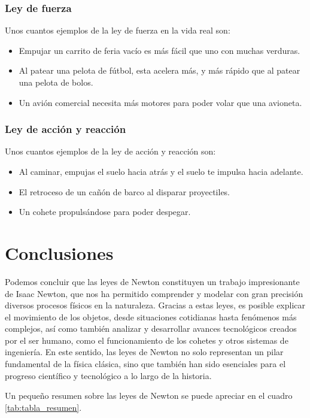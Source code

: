 \documentclass{article}
\begin{document}
\subsubsection{Ley de fuerza}
Unos cuantos ejemplos de la ley de fuerza en la vida real son:
\begin{itemize}
	\item Empujar un carrito de feria vacío es más fácil que uno con muchas verduras.
	\item Al patear una pelota de fútbol, esta acelera más, y más rápido que al patear una pelota de bolos.
	\item Un avión comercial necesita más motores para poder volar que una avioneta.
\end{itemize}

\subsubsection{Ley de acción y reacción}
Unos cuantos ejemplos de la ley de acción y reacción son:
\begin{itemize}
	\item Al caminar, empujas el suelo hacia atrás y el suelo te impulsa hacia adelante.
	\item El retroceso de un cañón de barco al disparar proyectiles.
	\item Un cohete propulsándose para poder despegar.
\end{itemize}

\newpage

\section{Conclusiones}

Podemos concluir que las leyes de Newton constituyen un trabajo impresionante de Isaac Newton, que nos ha permitido comprender y modelar con gran precisión diversos procesos físicos en la naturaleza. Gracias a estas leyes, es posible explicar el movimiento de los objetos, desde situaciones cotidianas hasta fenómenos más complejos, así como también analizar y desarrollar avances tecnológicos creados por el ser humano, como el funcionamiento de los cohetes y otros sistemas de ingeniería. En este sentido, las leyes de Newton no solo representan un pilar fundamental de la física clásica, sino que también han sido esenciales para el progreso científico y tecnológico a lo largo de la historia.

Un pequeño resumen sobre las leyes de Newton se puede apreciar en el cuadro \ref{tab:tabla_resumen}.
\end{document}
